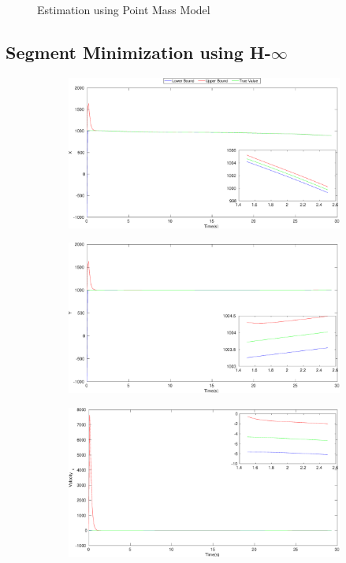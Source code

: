 \begin{figure}[h]
\begin{subfigure}{.5\linewidth}
\end{subfigure}
\caption{Estimation using Point Mass Model}
\end{figure}


\clearpage
\subsection{Segment Minimization using H-$\infty$}
\FloatBarrier
\begin{figure}[h]
\begin{subfigure}{.5\linewidth}
\centering
\includegraphics[width=\linewidth]{figures/HInf/s3cvHInfX}
\end{subfigure}
\begin{subfigure}{.5\linewidth}
\centering
\includegraphics[width=\linewidth]{figures/HInf/s3cvHInfY}
\end{subfigure}
\begin{subfigure}{.5\linewidth}
\centering
\includegraphics[width=.9\linewidth]{figures/HInf/s3cvHInfVelocity_x}

\end{subfigure}
\end{figure}
